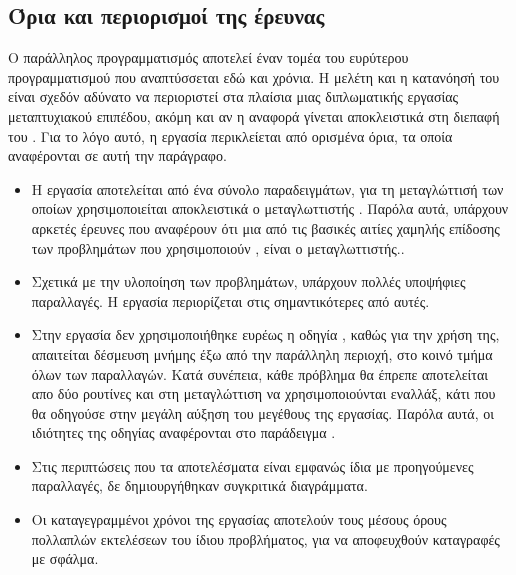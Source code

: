 \subsection{Όρια και περιορισμοί της έρευνας}
Ο παράλληλος προγραμματισμός αποτελεί έναν τομέα του ευρύτερου προγραμματισμού που αναπτύσσεται εδώ και χρόνια. Η μελέτη και η κατανόησή του είναι σχεδόν αδύνατο να περιοριστεί στα πλαίσια μιας διπλωματικής εργασίας μεταπτυχιακού επιπέδου, ακόμη και αν η αναφορά γίνεται αποκλειστικά στη διεπαφή του . Για το λόγο αυτό, η εργασία περικλείεται από ορισμένα όρια, τα οποία αναφέρονται σε αυτή την παράγραφο.
\begin{itemize}

\item{Η εργασία αποτελείται από ένα σύνολο παραδειγμάτων, για τη μεταγλώττισή των οποίων χρησιμοποιείται αποκλειστικά ο μεταγλωττιστής . Παρόλα αυτά, υπάρχουν αρκετές έρευνες που αναφέρουν ότι μια από τις βασικές αιτίες χαμηλής επίδοσης των προβλημάτων που χρησιμοποιούν , είναι ο μεταγλωττιστής.\cite{offloading_compilers}.}

\item{Σχετικά με την υλοποίηση των προβλημάτων, υπάρχουν πολλές υποψήφιες παραλλαγές. Η εργασία περιορίζεται στις σημαντικότερες από αυτές.}

\item{Στην εργασία δεν χρησιμοποιήθηκε ευρέως η οδηγία , καθώς για την χρήση της, απαιτείται δέσμευση μνήμης έξω από την παράλληλη περιοχή, στο κοινό τμήμα όλων των παραλλαγών. Κατά συνέπεια, κάθε πρόβλημα θα έπρεπε αποτελείται απο δύο  ρουτίνες και στη μεταγλώττιση να χρησιμοποιούνται εναλλάξ, κάτι που θα οδηγούσε στην μεγάλη αύξηση του μεγέθους της εργασίας. Παρόλα αυτά, οι ιδιότητες της οδηγίας  αναφέρονται στο παράδειγμα .}

\item{Στις περιπτώσεις που τα αποτελέσματα είναι εμφανώς ίδια με προηγούμενες παραλλαγές, δε δημιουργήθηκαν συγκριτικά διαγράμματα.}

\item{Οι καταγεγραμμένοι χρόνοι της εργασίας αποτελούν τους μέσους όρους πολλαπλών εκτελέσεων του ίδιου προβλήματος, για να αποφευχθούν καταγραφές με σφάλμα.}
\end{itemize}


\clearpage
